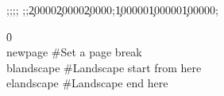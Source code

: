 {\ansi{}
{;;;;}
{\*\expandedcolortbl;;\cssrgb\c20000\c20000\c20000;\cssrgb\c100000\c100000\c100000;}
\pard{}\qj{}

\f0   
\\newpage       #Set a page break\
\\blandscape    #Landscape start from here\
\\elandscape    #Landscape end here}